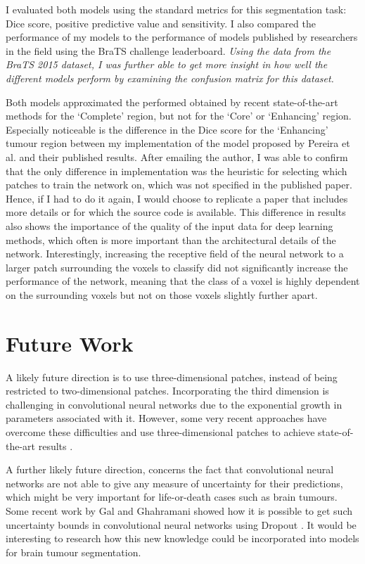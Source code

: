 \documentclass[12pt,a4paper,twoside,openright]{report}
\begin{document}
I evaluated both models using the standard metrics for this segmentation task: Dice score, positive predictive value and sensitivity. I also compared the performance of my models to the performance of models published by researchers in the field using the BraTS challenge leaderboard. \textit{Using the data from the BraTS 2015 dataset, I was further able to get more insight in how well the different models perform by examining the confusion matrix for this dataset.}

Both models approximated the performed obtained by recent state-of-the-art methods for the `Complete' region, but not for the `Core' or `Enhancing' region. Especially noticeable is the difference in the Dice score for the `Enhancing' tumour region between my implementation of the model proposed  by Pereira et al. and their published results. After emailing the author, I was able to confirm that the only difference in implementation was the heuristic for selecting which patches to train the network on, which was not specified in the published paper. Hence, if I had to do it again, I would choose to replicate a paper that includes more details or for which the source code is available. This difference in results also shows the importance of the quality of the input data for deep learning methods, which often is more important than the architectural details of the network. Interestingly, increasing the receptive field of the neural network to a larger patch surrounding the voxels to classify did not significantly increase the performance of the network, meaning that the class of a voxel is highly dependent on the surrounding voxels but not on those voxels slightly further apart.

\section{Future Work}
A likely future direction is to use three-dimensional patches, instead of being restricted to two-dimensional patches. Incorporating the third dimension is challenging in convolutional neural networks due to the exponential growth in parameters associated with it. However, some very recent approaches have overcome these difficulties and use three-dimensional patches to achieve state-of-the-art results \cite{kamnitsas}. 

A further likely future direction, concerns the fact that convolutional neural networks are not able to give any measure of uncertainty for their predictions, which might be very important for life-or-death cases such as brain tumours. Some recent work by Gal and Ghahramani showed how it is possible to get such uncertainty bounds in convolutional neural networks using Dropout \cite{Gal2015Dropout}. It would be interesting to research how this new knowledge could be incorporated into models for brain tumour segmentation.
\end{document}
